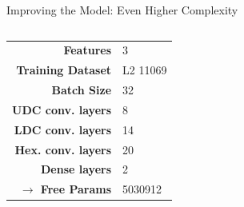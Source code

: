 \begin{frame}{Improving the Model: Even Higher Complexity}
    \begin{columns}
        \begin{column}{.35\textwidth}
            \begin{tabular}{>{\small\bf}r l}
                \toprule
                Features                  & 3          \\
                Training Dataset          & L2 11069   \\
                Batch Size                & 32         \\
                UDC conv. layers          & 8          \\
                LDC conv. layers          & 14         \\
                Hex. conv. layers         & 20         \\
                Dense layers              & 2\times300 \\
                $\rightarrow$ Free Params & 5030912    \\
                \bottomrule
            \end{tabular}
        \end{column}
        \begin{column}{.65\textwidth}
        \end{column}
    \end{columns}
\end{frame}
